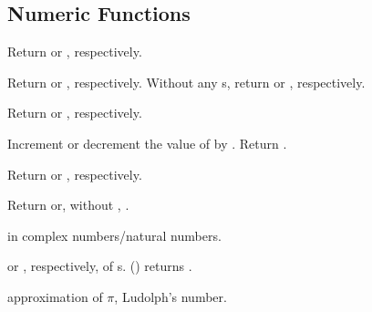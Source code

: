 \subsection{Numeric Functions}

\begin{LIST}{1cm}

  {
    Return  or , respectively.
  }

  {
    Return  or , respectively. Without any
    s, return  or , respectively.
  }

  {Return  or
    , respectively.
  }

  {
    Increment or decrement the value of  by . Return .
  }

  {
    Return  or , respectively.
  }

  {
    Return  or,
    without , .
  }

  {
     in complex numbers/natural numbers.
  }

  {
     or , respectively, of s. ()
    returns .
  }

  {
     approximation of $\pi$, Ludolph's number.
  }


\end{LIST}

